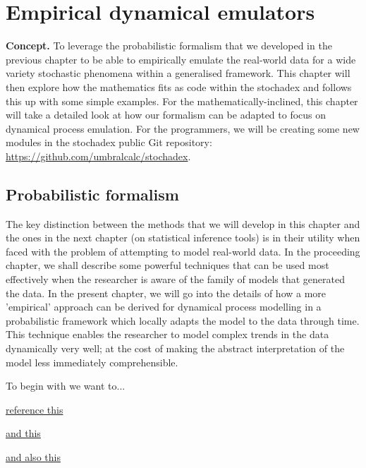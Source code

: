 \chapter{\sffamily Empirical dynamical emulators}

{\bfseries\sffamily Concept.} To leverage the probabilistic formalism that we developed in the previous chapter to be able to empirically emulate the real-world data for a wide variety stochastic phenomena within a generalised framework. This chapter will then explore how the mathematics fits as code within the stochadex and follows this up with some simple examples. For the mathematically-inclined, this chapter will take a detailed look at how our formalism can be adapted to focus on dynamical process emulation. For the programmers, we will be creating some new modules in the stochadex public Git repository: \href{https://github.com/umbralcalc/stochadex}{https://github.com/umbralcalc/stochadex}.

\section{\sffamily Probabilistic formalism}

The key distinction between the methods that we will develop in this chapter and the ones in the next chapter (on statistical inference tools) is in their utility when faced with the problem of attempting to model real-world data. In the proceeding chapter, we shall describe some powerful techniques that can be used most effectively when the researcher is aware of the family of models that generated the data. In the present chapter, we will go into the details of how a more 'empirical' approach can be derived for dynamical process modelling in a probabilistic framework which locally adapts the model to the data through time. This technique enables the researcher to model complex trends in the data dynamically very well; at the cost of making the abstract interpretation of the model less immediately comprehensible.

To begin with we want to...

\href{https://en.wikipedia.org/wiki/Empirical_dynamic_modeling#:~:text=Empirical%20dynamic%20modeling%20(EDM)%20is,Robert%20May%20and%20George%20Sugihara.}{reference this}

\href{https://en.wikipedia.org/wiki/Gaussian_process#:~:text=In%20probability%20theory%20and%20statistics,of%20them%20is%20normally%20distributed.}{and this}

\href{https://en.wikipedia.org/wiki/Local_regression}{and also this}